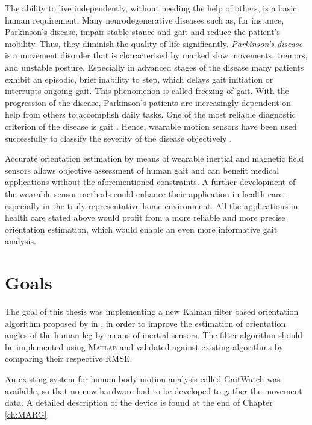 The ability to live independently, without needing the help of others, is a basic human requirement. Many neurodegenerative diseases such as, for instance, Parkinson's disease, impair stable stance and gait and reduce the patient's mobility. Thus, they diminish the quality of life significantly. \emph{Parkinson's disease} is a movement disorder that is characterised by marked slow movements, tremors, and unstable posture. Especially in advanced stages of the disease many patients exhibit an episodic, brief inability to step, which delays gait initiation or interrupts ongoing gait. This phenomenon is called freezing of gait. With the progression of the disease, Parkinson's patients are increasingly dependent on help from others to accomplish daily tasks. One of the most reliable diagnostic criterion of the disease is gait \cite{tao_gait_2012}. Hence, wearable motion sensors have been used successfully to classify the severity of the disease objectively \cite{mancini_anticipatory_2009, palmerini_feature_2011, klerk_long-term_2009}.

Accurate orientation estimation by means of wearable inertial and magnetic field sensors allows objective assessment of human gait and can benefit medical applications without the aforementioned constraints. A further development of the wearable sensor methods could enhance their application in health care \cite{wong_clinical_2007}, especially in the truly representative home environment. All the applications in health care stated above would profit from a more reliable and more precise orientation estimation, which would enable an even more informative gait analysis.

\section{Goals}

The goal of this thesis was implementing a new Kalman filter based orientation algorithm proposed by \citeauthor{bennett_motion_2014} in \cite{bennett_motion_2014}, in order to improve the estimation of orientation angles of the human leg by means of inertial sensors. The filter algorithm should be implemented using \textsc{Matlab}\textsuperscript{\textregistered} and validated against existing algorithms by comparing their respective \gls{RMSE}.

An existing system for human body motion analysis called GaitWatch was available, so that no new hardware had to be developed to gather the movement data. A detailed description of the device is found at the end of Chapter \ref{ch:MARG}. 

